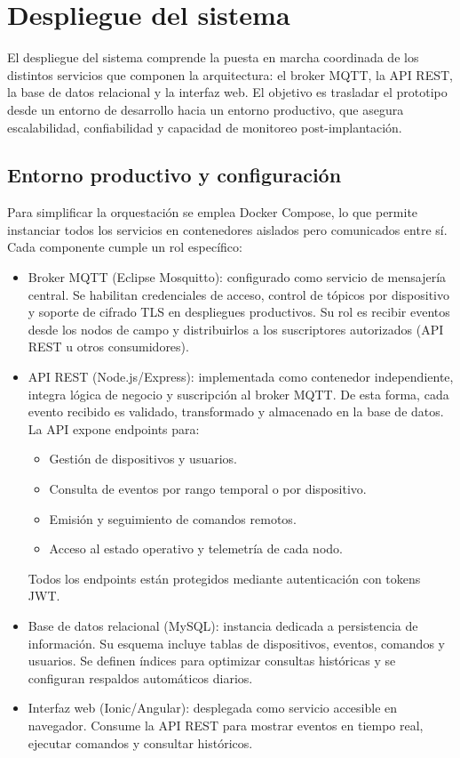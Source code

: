 \clearpage

\section{Despliegue del sistema}

El despliegue del sistema comprende la puesta en marcha coordinada de los distintos servicios que componen la arquitectura: el broker MQTT, la API REST, la base de datos relacional y la interfaz web.  
El objetivo es trasladar el prototipo desde un entorno de desarrollo hacia un entorno productivo, que asegura escalabilidad, confiabilidad y capacidad de monitoreo post-implantación.  

\subsection{Entorno productivo y configuración}

Para simplificar la orquestación se emplea Docker Compose, lo que permite instanciar todos los servicios en contenedores aislados pero comunicados entre sí.  
Cada componente cumple un rol específico:  

\begin{itemize}
    \item Broker MQTT (Eclipse Mosquitto): configurado como servicio de mensajería central. Se habilitan credenciales de acceso, control de tópicos por dispositivo y soporte de cifrado TLS en despliegues productivos. Su rol es recibir eventos desde los nodos de campo y distribuirlos a los suscriptores autorizados (API REST u otros consumidores).
    
    \item API REST (Node.js/Express): implementada como contenedor independiente, integra lógica de negocio y suscripción al broker MQTT. De esta forma, cada evento recibido es validado, transformado y almacenado en la base de datos. La API expone endpoints para:
    \begin{itemize}
        \item Gestión de dispositivos y usuarios.
        \item Consulta de eventos por rango temporal o por dispositivo.
        \item Emisión y seguimiento de comandos remotos.
        \item Acceso al estado operativo y telemetría de cada nodo.
    \end{itemize}
    Todos los endpoints están protegidos mediante autenticación con tokens JWT.
    
    \item Base de datos relacional (MySQL): instancia dedicada a persistencia de información. Su esquema incluye tablas de dispositivos, eventos, comandos y usuarios. Se definen índices para optimizar consultas históricas y se configuran respaldos automáticos diarios.
    
    \item Interfaz web (Ionic/Angular): desplegada como servicio accesible en navegador. Consume la API REST para mostrar eventos en tiempo real, ejecutar comandos y consultar históricos.
\end{itemize}

